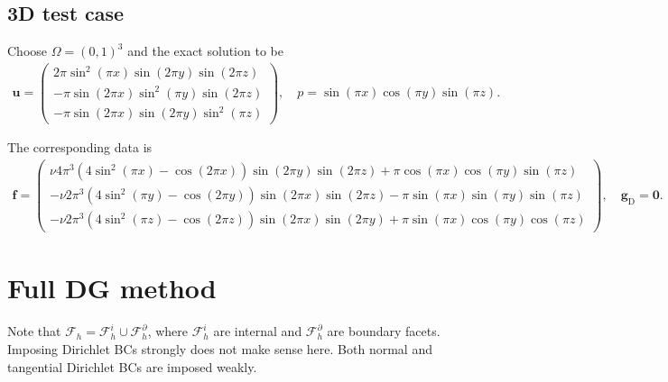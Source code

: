 \documentclass[11pt,a4paper,oneside,onecolumn]{scrartcl}
\newcommand{\ff}{{ \boldsymbol{f} }}
\newcommand{\uu}{{ \boldsymbol{u} }}
\newcommand{\zero}{{ \boldsymbol{0} }}
\newcommand{\gbld}{{ \boldsymbol{g} }}
\newcommand{\Drm}{{ \mathrm{D} }}
\newcommand{\F}{{ \mathcal{F}_h }}
\newcommand{\Fi}{{ \mathcal{F}_h^i }}
\newcommand{\Fb}{{ \mathcal{F}_h^\partial }}
\newcommand\rb[1]{{ \left(#1\right) }}
\begin{document}
\subsection{3D test case}	

Choose $\Omega=\rb{0,1}^3$ and the exact solution to be 
\begin{align*}
	\uu = \begin{pmatrix}
		2\pi \sin^2(\pi x) \sin(2 \pi y) \sin(2\pi z) \\
		-\pi \sin(2 \pi x) \sin^2(\pi y) \sin(2\pi z) \\
		-\pi \sin(2 \pi x) \sin(2 \pi y) \sin^2(\pi z)
	\end{pmatrix},
	\quad
	p = \sin(\pi x) \cos(\pi y) \sin(\pi z).
\end{align*}

The corresponding data is 
\begin{align*}
	\ff = \begin{pmatrix}
		\nu 4\pi^3 (4\sin^2(\pi x)-\cos(2\pi x))\sin(2\pi y)\sin(2\pi z) +\pi\cos(\pi x)\cos(\pi y) \sin(\pi z) \\
		-\nu 2\pi^3 (4\sin^2(\pi y)-\cos(2\pi y))\sin(2\pi x)\sin(2\pi z) -\pi\sin(\pi x)\sin(\pi y) \sin(\pi z) \\
		-\nu 2\pi^3 (4\sin^2(\pi z)-\cos(2\pi z))\sin(2\pi x)\sin(2\pi y) +\pi\sin(\pi x)\cos(\pi y)\cos(\pi z)
	\end{pmatrix},
	\quad
	\gbld_\Drm = \zero. 
\end{align*}


\newpage
\section{Full DG method}	

Note that $\F=\Fi\cup\Fb$, where $\Fi$ are internal and $\Fb$ are boundary facets. \\

Imposing Dirichlet BCs strongly does not make sense here. Both normal and tangential Dirichlet BCs are imposed weakly.
\end{document}
